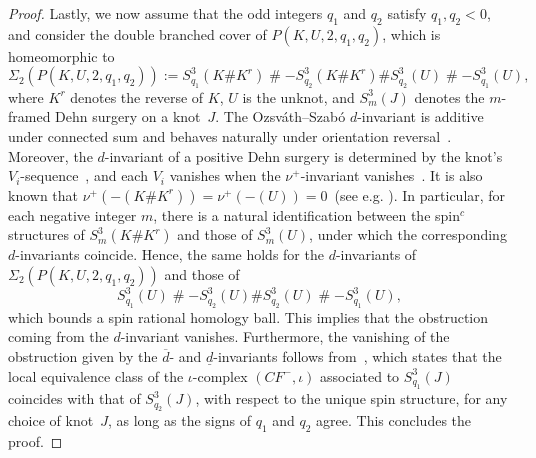 \documentclass[11pt, reqno]{amsart}
\theoremstyle{definition}
\theoremstyle{remark}
\def\CF {\mathit{CF}}
\newcommand \CFm {\CF^-}
\numberwithin{equation}{section}
\begin{document}
\begin{proof}
Lastly, we now assume that the odd integers $q_1$ and $q_2$ satisfy $q_1, q_2 < 0$, and consider the double branched cover of $P(K, U, 2, q_1, q_2)$, which is homeomorphic to
\[
\Sigma_2(P(K, U, 2, q_1, q_2)) := S^3_{q_1}(K \# K^r) \mathbin{\#} -S^3_{q_2}(K \# K^r) \# S^3_{q_2}(U) \mathbin{\#} -S^3_{q_1}(U),
\]
where $K^r$ denotes the reverse of $K$, $U$ is the unknot, and $S^3_m(J)$ denotes the $m$-framed Dehn surgery on a knot~$J$.
The Ozsv\'{a}th--Szab\'{o} $d$-invariant is additive under connected sum and behaves naturally under orientation reversal~\cite{Oz-Sz:dinvt}. Moreover, the $d$-invariant of a positive Dehn surgery is determined by the knot's $V_i$-sequence~\cite{Rasmussen:2004, Ni-Wu:2015}, and each $V_i$ vanishes when the $\nu^+$-invariant vanishes~\cite{Hom-Wu:2016}. It is also known that $\nu^+(-(K \# K^r)) = \nu^+(-(U))= 0$~(see e.g. \cite[Theorem 1.5]{BCG:2017}). 
In particular, for each negative integer $m$, there is a natural identification between the spin$^c$ structures of $S^3_m(K \# K^r)$ and those of $S^3_m(U)$, under which the corresponding $d$-invariants coincide. Hence, the same holds for the $d$-invariants of $\Sigma_2(P(K, U, 2, q_1, q_2))$ and those of
\[
S^3_{q_1}(U) \mathbin{\#} -S^3_{q_2}(U) \# S^3_{q_2}(U) \mathbin{\#} -S^3_{q_1}(U),
\]
which bounds a spin rational homology ball. This implies that the obstruction coming from the $d$-invariant vanishes. Furthermore, the vanishing of the obstruction given by the $\overline{d}$- and $\underline{d}$-invariants follows from~\cite[Theorem~1.6]{HHSZ:2020}, which states that the local equivalence class of the $\iota$-complex $(\CFm, \iota)$ associated to $S^3_{q_1}(J)$ coincides with that of $S^3_{q_2}(J)$, with respect to the unique spin structure, for any choice of knot~$J$, as long as the signs of $q_1$ and $q_2$ agree. This concludes the proof.
\end{proof}




\end{document}
